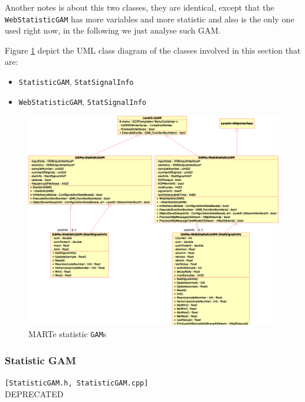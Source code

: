 Another notes is about this two classes, they are identical, except that the \texttt{WebStatisticGAM} has more variables and more statistic and also is the only one used right now, in the following we just analyse such GAM.

Figure \ref{f:MARTe:GAM:Stats} depict the UML class diagram of the classes involved in this section that are:
\begin{itemize}
 \item \texttt{StatisticGAM}, \texttt{StatSignalInfo}
 \item \texttt{WebStatisticGAM}, \texttt{StatSignalInfo}
\end{itemize}

\begin{figure}[h!]
 \begin{center}
  \includegraphics[width=\textwidth]{MARTe/GAMs-Statistic.eps}
  \caption{MARTe statistic \texttt{GAM}s}
  \label{f:MARTe:GAM:Stats}
 \end{center}
\end{figure}



\subsubsection{Statistic GAM}
\texttt{[StatisticGAM.h, StatisticGAM.cpp]} \\

DEPRECATED \\



